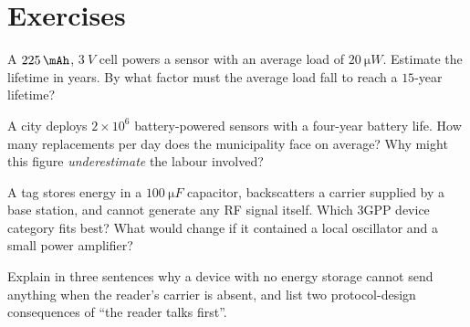 \section*{Exercises}
\begin{exercise}\label{ex:battery}
A $\SI{225}{\mAh}$, $\SI{3}{V}$ cell powers a sensor with an average load of
$\SI{20}{\micro W}$. Estimate the lifetime in years. By what factor must
the average load fall to reach a $15$-year lifetime?
\end{exercise}
\begin{exercise}\label{ex:swaps}
A city deploys $2\times10^{6}$ battery-powered sensors with a four-year
battery life. How many replacements per day does the municipality face
on average? Why might this figure \emph{underestimate} the labour involved?
\end{exercise}
\begin{exercise}\label{ex:classify}
A tag stores energy in a $\SI{100}{\micro F}$ capacitor, backscatters a carrier
supplied by a base station, and cannot generate any RF signal itself.
Which 3GPP device category fits best? What would change if it contained a
local oscillator and a small power amplifier?
\end{exercise}
\begin{exercise}\label{ex:reader}
Explain in three sentences why a device with no energy storage cannot send
anything when the reader's carrier is absent, and list two protocol-design
consequences of ``the reader talks first''.
\end{exercise}
